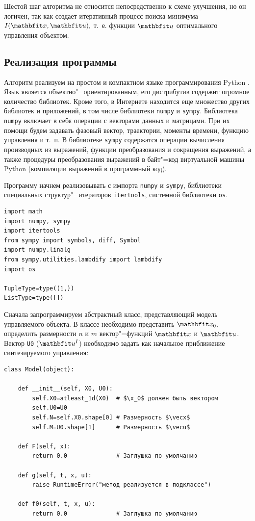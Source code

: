 \documentclass[a4paper,14pt, openany, twoside, draft]{extbook} %
\begin{document}
Шестой шаг алгоритма не относится непосредственно к схеме улучшения, но он логичен, так как создает итеративный процесс поиска минимума $I(\x,\u),$ т.~е. функции $\vecu$ оптимального  управления объектом.

\subsection{Реализация программы}
\label{sec:improprog}

Алгоритм реализуем на простом и компактном языке программирования Python \cite{pythondl,pythondoc,pythonbook}.  Язык является объектно"=ориентированным, его дистрибутив содержит огромное количество библиотек.  Кроме того, в Интернете находится еще множество других библиотек и приложений, в том числе библиотеки \texttt{numpy} и \texttt{sympy}.  Библиотека \texttt{numpy} включает в себя операции с векторами данных и матрицами.  При их помощи будем задавать фазовый вектор, траектории, моменты времени, функцию управления и т.~п.  В библиотеке \texttt{sympy} содержатся операции вычисления производных из выражений, функции преобразования и сокращения выражений, а также процедуры преобразования выражений в байт"=код виртуальной машины Python (компиляции выражений в программный код).

Программу начнем реализовывать с импорта \texttt{numpy} и \texttt{sympy}, библиотеки специальных структур"=итераторов \texttt{itertools}, системной библиотеки \texttt{os}.
\begin{verbatim}
import math
import numpy, sympy
import itertools
from sympy import symbols, diff, Symbol
import numpy.linalg
from sympy.utilities.lambdify import lambdify
import os

TupleType=type((1,))
ListType=type([])
\end{verbatim}

Сначала запрограммируем абстрактный класс, представляющий модель управляемого объекта.  В классе необходимо представить $\x_0$, определить размерности $n$ и $m$ вектор"=функций $\x$ и $\u$.  Вектор \texttt{U0} ($\u^{I}$) необходимо задать как начальное приближение синтезируемого управления:

\begin{verbatim}
class Model(object):

    def __init__(self, X0, U0):
        self.X0=atleast_1d(X0)  # $\x_0$ должен быть вектором
        self.U0=U0
        self.N=self.X0.shape[0] # Размерность $\vecx$
        self.M=U0.shape[1]      # Размерность $\vecu$

    def F(self, x):
        return 0.0              # Заглушка по умолчанию

    def g(self, t, x, u):
        raise RuntimeError("метод реализуется в подклассе")

    def f0(self, t, x, u):
        return 0.0              # Заглушка по умолчанию
\end{verbatim}
\end{document}
